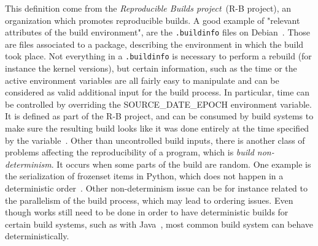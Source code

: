 \documentclass[a4paper,11pt,oneside]{report}
\theoremstyle{definition}
\newcommand{\rb}{reproducible builds\xspace}
\newcommand{\sde}{SOURCE\_DATE\_EPOCH\xspace}
\begin{document}
This definition come from the \emph{Reproducible Builds project}~(R-B
project), an organization which promotes \rb. A good example of "relevant
attributes of the build environment", are the \verb|.buildinfo| files on
Debian~\cite{debian:buildinfo}. Those are files associated to a package,
describing the environment in which the build took place. Not everything in a
\verb|.buildinfo| is necessary to perform a rebuild (for instance the kernel
versions), but certain information, such as the time or the active environment
variables are all fairly easy to manipulate and can be considered as valid
additional input for the build process. In particular, time can be controlled
by overriding the \sde environment variable. It is defined as part of the R-B
project, and can be consumed by build systems to make sure the resulting build
looks like it was done entirely at the time specified by the variable~\cite{rb:sde}.
Other than uncontrolled build inputs, there is another class of problems
affecting the reproducibility of a program, which is \emph{build
non-determinism}. It occurs when some parts of the build are random. One example
is the serialization of frozenset items in Python, which does not happen in a
deterministic order~\cite{gh:pyc-frozenset}. Other non-determinism issue can be
for instance related to the parallelism of the build process, which may lead to
ordering issues. Even though works still need to be done in order to have
deterministic builds for certain build systems, such as with
Java~\cite{xiong2022towards}, most common build system can behave
deterministically.
\end{document}

